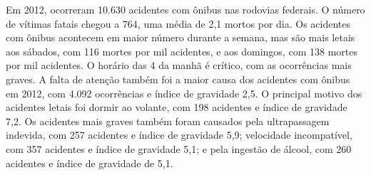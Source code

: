 \begin{itemize}
   Em 2012, ocorreram 10.630 acidentes com ônibus nas rodovias federais. O número de vítimas fatais chegou a 764, uma média de 2,1 mortos por dia. Os acidentes com ônibus acontecem em maior número durante a semana, mas são mais letais aos sábados, com 116 mortes por mil acidentes, e aos domingos, com 138 mortes por mil acidentes. O horário das 4 da manhã é crítico, com as ocorrências mais graves.
   A falta de atenção também foi a maior causa dos acidentes com ônibus em 2012, com 4.092 ocorrências e índice de gravidade 2,5. O principal motivo dos acidentes letais foi dormir ao volante, com 198 acidentes e índice de gravidade 7,2. Os acidentes mais graves também foram causados pela ultrapassagem indevida, com 257 acidentes e índice de gravidade 5,9; velocidade incompatível, com 357 acidentes e índice de gravidade 5,1; e pela ingestão de álcool, com 260 acidentes e índice de gravidade de 5,1.

 \end{itemize}
